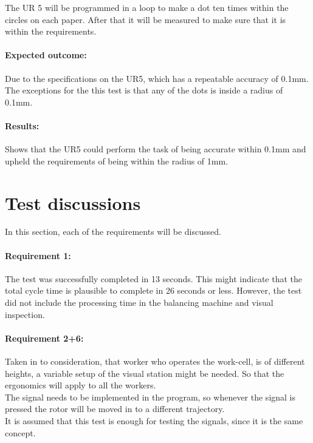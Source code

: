 The UR 5 will be programmed in a loop to make a dot ten times within the circles on each paper. After that it will be measured to make sure that it is within the requirements.

\paragraph{Expected outcome:}
Due to the specifications on the UR5, which has a repeatable accuracy of 0.1mm. The exceptions for the this test is that any of the dots is inside a radius of 0.1mm.

\paragraph{Results: }
Shows that the UR5 could perform the task of being accurate within 0.1mm and upheld the requirements of being within the radius of 1mm. 



\section{Test discussions}
In this section, each of the requirements will be discussed. 

\paragraph{Requirement 1:}
The test was successfully completed in 13 seconds. This might indicate that the total cycle time is plausible to complete in 26 seconds or less. However, the test did not include the processing time in the balancing machine and visual inspection. 

\paragraph{Requirement 2+6:}
Taken in to consideration, that worker who operates the work-cell, is of different heights, a variable setup of the visual station might be needed. So that the ergonomics will apply to all the workers.\\
The signal needs to be implemented in the program, so whenever the signal is pressed the rotor will be moved in to a different trajectory.\\
It is assumed that this test is enough for testing the signals, since it is the same concept.

